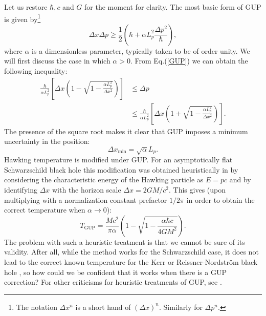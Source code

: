 \documentclass[12pt,preprintnumbers, floatfix, preprintnumbers, letterpaper, superscriptaddress,nofootinbib]{revtex4-2}
\begin{document}
Let us restore $\hbar, c$ and $G$ for the moment for clarity.
The most basic form of GUP is given by\footnote{The notation $\Delta x^n$ is a short hand of $(\Delta x)^n$. Similarly for $\Delta p^n$.}
\begin{equation}\label{GUP}
\Delta x \Delta p \geqslant \frac{1}{2}\left(\hbar + \alpha L_p^2 \frac{\Delta p^2}{\hbar}\right),
\end{equation}
where $\alpha$ is a dimensionless parameter, typically taken to be of order unity. We will first discuss the case in which $\alpha > 0$.
From Eq.(\ref{GUP}) we can obtain the following inequality:
\begin{equation}\label{inequa}
\begin{aligned}
\frac{\hbar}{\alpha L_p^2}\left[\Delta x \left(1-\sqrt{1-\frac{\alpha L_p^2}{\Delta x^2}}\right)\right] &\leqslant \Delta p \\ 
&\leqslant \frac{\hbar}{\alpha L_p^2} \left[\Delta x \left(1+\sqrt{1-\frac{\alpha L_p^2}{ \Delta x^2}}\right)\right].
\end{aligned}
\end{equation}
The presence of the square root makes it clear that GUP imposes a minimum uncertainty in the position: 
\begin{equation}\label{xmin}
\Delta x_\text{min} = {\sqrt{\alpha}}{L_p}.
\end{equation} 
Hawking temperature is modified under GUP. For an asymptotically flat Schwarzschild black hole this modification was obtained heuristically in \cite{0106080} by considering the characteristic energy of the Hawking particle as $E = pc$ and by identifying $\Delta x$ with the horizon scale $\Delta x = 2GM/c^2$. This gives (upon multiplying with a normalization constant prefactor $1/2\pi$ in order to obtain the correct temperature when $\alpha \to 0$):
\begin{equation}\label{TGUP}
T_\text{GUP} = \frac{Mc^2}{\pi \alpha}\left(1-\sqrt{1-\frac{\alpha \hbar c}{4GM^2}}\right).
\end{equation}
The problem with such a heuristic treatment is that we cannot be sure of its validity. After all, while the method works for the Schwarzschild case, it does not lead to the correct known temperature for the Kerr or Reissner-Nordstr\"om black hole \cite{2407.21114}, so how could we be confident that it works when there is a GUP correction? For other criticisms for heuristic treatments of GUP, see \cite{2005.12075,2303.10719,2305.16193}.
\end{document}
